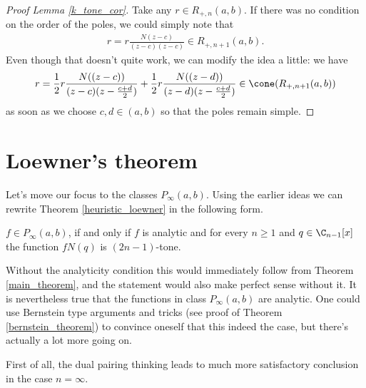 \begin{proof}[Proof Lemma \ref{k_tone_cor}]
	Take any $r \in R_{+, n}(a, b)$. If there was no condition on the order of the poles, we could simply note that
	\begin{align*}
		r = r \frac{N(z - c)}{(z - c) (z - c)} \in R_{+, n + 1}(a, b).
	\end{align*}
	Even though that doesn't quite work, we can modify the idea a little: we have
	\begin{align*}
		r = \frac{1}{2} r \frac{N((z - c))}{(z - c) (z - \frac{c + d}{2})} +  \frac{1}{2} r \frac{N((z - d))}{(z - d) (z - \frac{c + d}{2})} \in \cone(R_{+, n + 1}(a, b))
	\end{align*}
	as soon as we choose $c, d \in (a, b)$ so that the poles remain simple.
\end{proof}

\section{Loewner's theorem}\label{loewner_first_touch}

Let's move our focus to the classes $P_{\infty}(a, b)$. Using the earlier ideas we can rewrite Theorem \ref{heuristic_loewner} in the following form.

\begin{lause}\label{better_loewner}
	$f \in P_{\infty}(a, b)$, if and only if $f$ is analytic and for every $n \geq 1$ and $q \in \C_{n - 1}[x]$ the function $f N(q)$ is $(2 n - 1)$-tone.
\end{lause}

Without the analyticity condition this would immediately follow from Theorem \ref{main_theorem}, and the statement would also make perfect sense without it. It is nevertheless true that the functions in class $P_{\infty}(a, b)$ are analytic. One could use Bernstein type arguments and tricks (see proof of Theorem \ref{bernstein_theorem}) to convince oneself that this indeed the case, but there's actually a lot more going on.

First of all, the dual pairing thinking leads to much more satisfactory conclusion in the case $n = \infty$.

